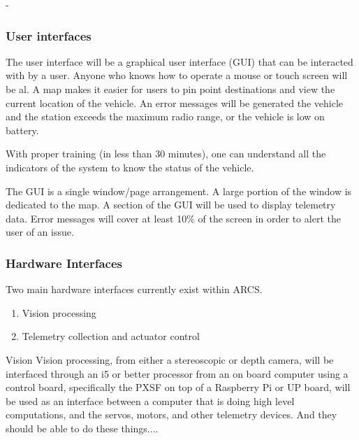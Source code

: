 -\documentclass[compsoc,draftclsnofoot,onecolumn,10pt]{IEEEtran}
\begin{document}
\subsubsection{User interfaces} %
The user interface will be a graphical user interface (GUI) that can be interacted with by a user. 
Anyone who knows how to operate a mouse or touch screen will be al. 
A map makes it easier for users to pin point destinations and view the current location of the vehicle. 
An error messages will be generated the vehicle and the station exceeds the maximum radio range, or the vehicle is low on battery.\par
With proper training (in less than 30 minutes), one can understand all the indicators of the system to know the status of the vehicle.\par
The GUI is a single window/page arrangement. 
A large portion of the window is dedicated to the map. 
A section of the GUI will be used to display telemetry data. 
Error messages will cover at least 10\% of the screen in order to alert the user of an issue.

\subsubsection{Hardware Interfaces} %
Two main hardware interfaces currently exist within ARCS. 
\begin{enumerate}
	\item Vision processing
	\item Telemetry collection and actuator control
\end{enumerate}

Vision 
Vision processing, from either a stereoscopic or depth camera, will be interfaced through 
an i5 or better processor from an on board computer using a control board, specifically 
the PXSF on top of a Raspberry Pi or UP board, will be used as an interface between a 
computer that is doing high level computations, and the servos, motors, and other telemetry 
devices. 
And they should be able to do these things....

\end{document}
